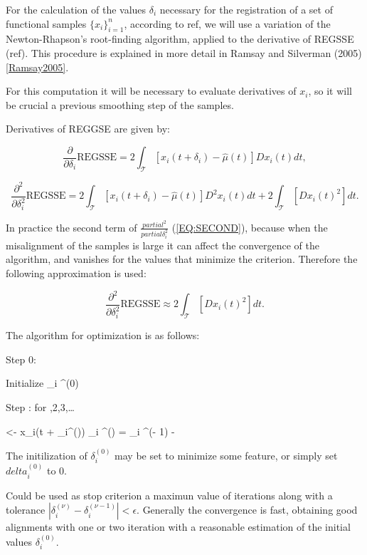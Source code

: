 

For the calculation of the values $\delta_i$ necessary for the registration of a
set of functional samples $\{x_i\}_{i=1}^{n}$, according to ref{},
we will use a variation of the Newton-Rhapson's root-finding algorithm, applied
to the derivative of REGSSE (ref{}). This procedure is explained in more detail
in Ramsay and Silverman (2005) \ref{Ramsay2005}.

For this computation it will be necessary to evaluate derivatives of
$x_i$, so it will be crucial a previous smoothing step of the samples.

Derivatives of REGGSE are given by:

\begin{equation}
\frac{\partial}{\partial \delta_i} \text{REGSSE} = 2 \int_{\mathcal{T}}
\left [ x_i(t + \delta_i) - \hat \mu(t) \right ] Dx_i(t) dt,
\end{equation}

\begin{equation}[EQ:SECOND]{}
\frac{\partial^2}{\partial \delta^2_i} \text{REGSSE} = 2
\int_{\mathcal{T}} \left [ x_i(t + \delta_i) - \hat \mu(t) \right ]
D^2x_i(t) dt + 2 \int_{\mathcal{T}} \left [  Dx_i(t)^2 \right ]  dt.
\end{equation}

In practice the second term of $\frac{partial^2}{partial \delta^2_i}$
(\ref{EQ:SECOND}), because when the misalignment of the samples is large it
can affect the convergence of the algorithm, and vanishes for the values that
minimize the criterion. Therefore the following approximation is used:

\begin{equation}
\frac{\partial^2}{\partial \delta^2_i} \text{REGSSE} \approx  
2 \int_{\mathcal{T}} \left [  Dx_i(t)^2 \right ]  dt.
\end{equation}

The algorithm for optimization is as follows:

Step 0:

Initialize  \delta_i ^{(0)}

Step \nu: for ,2,3,…

\hat \mu   <-  \sum x_i(t + \delta_i^{()})
\delta_i ^{(\nu)} = \delta_i ^{(\nu - 1)} - \alpha {}


The initilization of $\delta_i ^{(0)}$ may be set to minimize some feature, or
simply set $delta_i ^{(0)}$ to $0$.

Could be used as stop criterion a maximun value of iterations along with a
tolerance $| \delta_i ^{(\nu)} - \delta_i ^{(\nu-1)} | < \epsilon$.
Generally the convergence is fast, obtaining good alignments with one or two
iteration with a reasonable estimation of the initial values $\delta_i ^{(0)}$.

